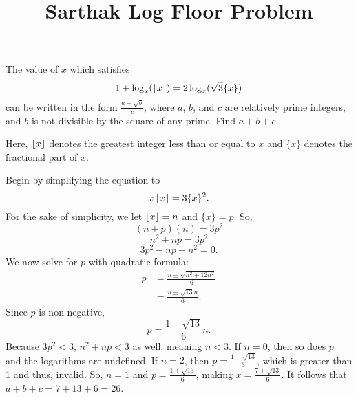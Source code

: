 \documentclass[11pt]{scrartcl}
\title{Sarthak Log Floor Problem}
\begin{document}
\begin{problem}
    The value of $x$ which satisfies
    \[1 + \log_{x}(\left\lfloor x \right\rfloor) = 2\log_{x}(\sqrt{3}\{x\})\]
    can be written in the form $\frac{a + \sqrt{b}}{c}$, where $a$, $b$, and $c$ are relatively prime integers, and $b$ is not divisible by the square of any prime. Find $a + b + c$.
    
    Here, $\left\lfloor x \right\rfloor$ denotes the greatest integer less than or equal to $x$ and $\{x\}$ denotes the fractional part of $x$.    
\end{problem}

\begin{soln}
    Begin by simplifying the equation to
    \[x\left\lfloor x \right\rfloor = 3\{x\}^{2}.\]
    For the sake of simplicity, we let $\left\lfloor x \right\rfloor = n$ and $\{x\} = p$. So,
    \[(n + p)(n) = 3p^{2}\]
    \[n^{2} + np = 3p^{2}\]
    \[3p^{2} - np - n^{2} = 0.\]
    We now solve for $p$ with quadratic formula:
    \begin{align*}
        p &= \frac{n \pm \sqrt{n^{2} + 12n^{2}}}{6} \\
        &= \frac{n \pm \sqrt{13}n}{6}.
    \end{align*}
    Since $p$ is non-negative,
    \[p = \frac{1 + \sqrt{13}}{6}n.\]
    Because $3p^{2} < 3$, $n^{2} + np < 3$ as well, meaning $n < 3$. If $n = 0$, then so does $p$ and the logarithms are undefined. If $n = 2$, then $p = \frac{1 + \sqrt{13}}{3}$, which is greater than 1 and thus, invalid. So, $n = 1$ and $p = \frac{1 + \sqrt{13}}{6}$, making $x = \frac{7 + \sqrt{13}}{6}$. It follows that $a + b + c = 7 + 13 + 6 = 26$.
\end{soln}
\end{document}
